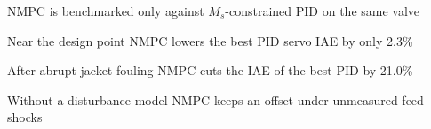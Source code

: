 \begin{highlights}
\item NMPC is benchmarked only against $M_s$-constrained PID on the same valve
\item Near the design point NMPC lowers the best PID servo IAE by only 2.3\%
\item After abrupt jacket fouling NMPC cuts the IAE of the best PID by 21.0\%
\item Without a disturbance model NMPC keeps an offset under unmeasured feed shocks
\end{highlights}
